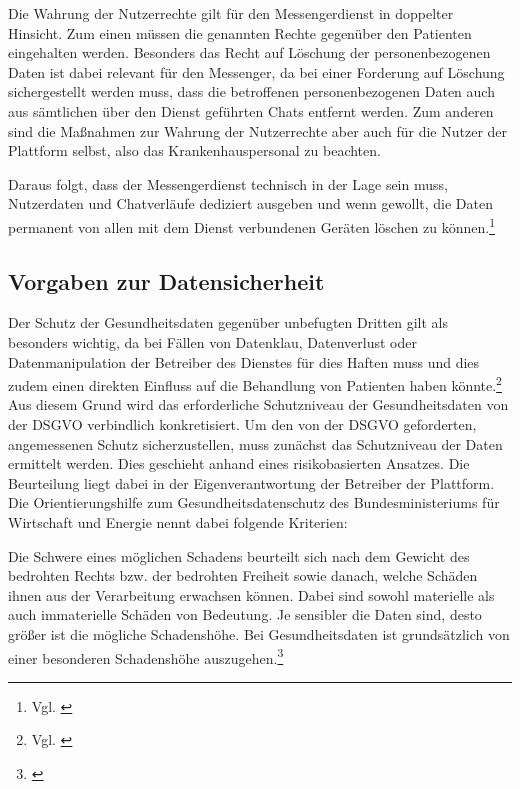 Die Wahrung der Nutzerrechte gilt für den Messengerdienst in doppelter Hinsicht.
Zum einen müssen die genannten Rechte gegenüber den Patienten eingehalten werden. Besonders das Recht auf Löschung der personenbezogenen Daten ist dabei relevant für den Messenger, da bei einer Forderung auf Löschung sichergestellt werden muss, dass die betroffenen personenbezogenen Daten auch aus sämtlichen über den Dienst geführten Chats entfernt werden. Zum anderen sind die Maßnahmen zur Wahrung der Nutzerrechte aber auch für die Nutzer der Plattform selbst, also das Krankenhauspersonal zu beachten.

Daraus folgt, dass der Messengerdienst technisch in der Lage sein muss, Nutzerdaten und Chatverläufe dediziert ausgeben und wenn gewollt, die Daten permanent von allen mit dem Dienst verbundenen Geräten löschen zu können.\footnote{Vgl. \cite[S. 36 ff.]{Bundesaerztekammer2019}}

\subsection{Vorgaben zur Datensicherheit}\label{subsection:vzd}
Der Schutz der Gesundheitsdaten gegenüber unbefugten Dritten gilt als besonders wichtig, da bei Fällen von Datenklau, Datenverlust oder Datenmanipulation der Betreiber des Dienstes für dies Haften muss und dies zudem einen direkten Einfluss auf die Behandlung von Patienten haben könnte.\footnote{Vgl. \cite[S. 3]{Bundesaerztekammer2019}} Aus diesem Grund wird das erforderliche Schutzniveau der Gesundheitsdaten von der DSGVO verbindlich konkretisiert.
Um den von der DSGVO geforderten, angemessenen Schutz sicherzustellen, muss zunächst das Schutzniveau der Daten ermittelt werden.
Dies geschieht anhand eines risikobasierten Ansatzes. Die Beurteilung liegt dabei in der Eigenverantwortung der Betreiber der Plattform. Die \glqq Orientierungshilfe zum Gesundheitsdatenschutz\grqq{} des Bundesministeriums für Wirtschaft und Energie nennt dabei folgende Kriterien:

\glqq Die Schwere eines möglichen Schadens beurteilt sich nach dem Gewicht des bedrohten Rechts bzw. der bedrohten Freiheit sowie danach, welche Schäden ihnen aus der Verarbeitung erwachsen können. Dabei sind sowohl materielle als auch immaterielle Schäden von Bedeutung. Je sensibler die Daten sind, desto größer ist die mögliche Schadenshöhe. Bei Gesundheitsdaten ist grundsätzlich von einer besonderen Schadenshöhe auszugehen.\grqq{}\footnote{\cite[S. 41]{Bundesaerztekammer2019}}

